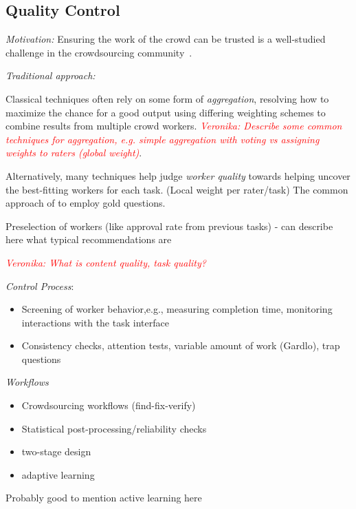 \documentclass[10pt,twocolumn,letterpaper]{article}
\newcommand{\veronika}[1]{\emph{\textcolor{red}{Veronika: #1}}}
\begin{document}

\subsection{Quality Control}
\emph{Motivation:} Ensuring the work of the crowd can be trusted is a well-studied challenge in the crowdsourcing community~\cite{daniel2018quality}.  

\emph{Traditional approach:}

Classical techniques often rely on some form of \emph{aggregation}, resolving how to maximize the chance for a good output using differing weighting schemes to combine results from multiple crowd workers. \veronika{Describe some common techniques for aggregation, e.g. simple aggregation with voting vs assigning weights to raters (global weight)}. 

Alternatively, many techniques help judge \emph{worker quality} towards helping uncover the best-fitting workers for each task. (Local weight per rater/task) The common approach of to employ gold questions.

Preselection of workers (like approval rate from previous tasks) - can describe here what typical recommendations are

\veronika{What is content quality, task quality?}

\emph{Control Process}:
\begin{itemize}
    \item Screening of worker behavior,e.g., measuring completion time, monitoring interactions with the task interface\cite{hirth2014predicting, kazai2016quality, mok2017detecting, goyal2018your}
    \item Consistency checks, attention tests, variable amount of work (Gardlo), trap questions
\end{itemize}


\emph{Workflows}
\begin{itemize}
    \item Crowdsourcing workflows (find-fix-verify)
    \item Statistical post-processing/reliability checks
    \item two-stage design
    \item adaptive learning
\end{itemize}


Probably good to mention active learning here
\end{document}
